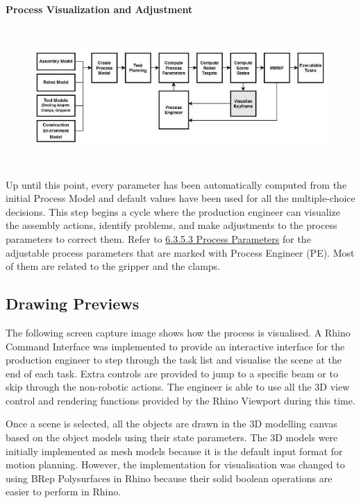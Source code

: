 \documentclass[11pt]{book}
\begin{document}
\vspace{1\baselineskip}
\paragraph{Process Visualization and Adjustment}

\begin{figure}[H]
\includegraphics[width=15.92cm,height=5.19cm]{./images/image40.jpeg}
\end{figure}


Up until this point, every parameter has been automatically computed from the initial Process Model and default values have been used for all the multiple-choice decisions. This step begins a cycle where the production engineer can visualize the assembly actions, identify problems, and make adjustments to the process parameters to correct them. Refer to \uline{6.3.5.3 Process Parameters} for the adjustable process parameters that are marked with Process Engineer (PE). Most of them are related to the gripper and the clamps. 

\subsection{Drawing Previews}

The following screen capture image shows how the process is visualised. A Rhino Command Interface was implemented to provide an interactive interface for the production engineer to step through the task list and visualise the scene at the end of each task. Extra controls are provided to jump to a specific beam or to skip through the non-robotic actions. The engineer is able to use all the 3D view control and rendering functions provided by the Rhino Viewport during this time.

Once a scene is selected, all the objects are drawn in the 3D modelling canvas based on the object models using their state parameters. The 3D models were initially implemented as mesh models because it is the default input format for motion planning. However, the implementation for visualisation was changed to using BRep Polysurfaces in Rhino because their solid boolean operations are easier to perform in Rhino. 
\end{document}
